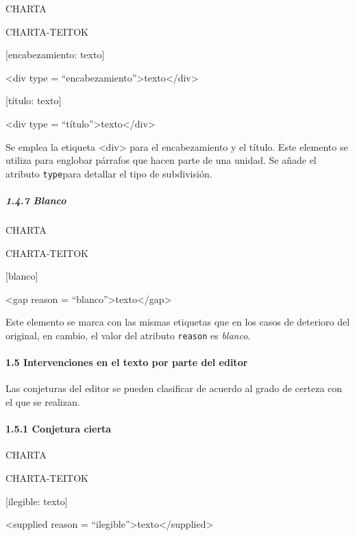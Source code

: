 \documentclass[
]{book}
\begin{document}
CHARTA

CHARTA-TEITOK

{[}encabezamiento: texto{]}

{\textless div} {type} {=} {``encabezamiento''}{\textgreater{}}texto{\textless/div\textgreater{}}

{[}título: texto{]}

{\textless div} {type} {=} {``título''}{\textgreater{}}texto{\textless/div\textgreater{}}

Se emplea la etiqueta { \textless div\textgreater{}} para el encabezamiento y el título. Este elemento se utiliza para englobar párrafos que hacen parte de una unidad. Se añade el atributo \texttt{type}para detallar el tipo de subdivisión.

\hypertarget{blanco}{%
\subparagraph*{1.4.7 Blanco}\label{blanco}}

CHARTA

CHARTA-TEITOK

{[}blanco{]}

{\textless gap} {reason} {=} {``blanco''}{\textgreater{}}texto{\textless/gap\textgreater{}}

Este elemento se marca con las mismas etiquetas que en los casos de deterioro del original, en cambio, el valor del atributo \texttt{reason} es \emph{blanco}.

\hypertarget{intervenciones-en-el-texto-por-parte-del-editor}{%
\paragraph*{1.5 Intervenciones en el texto por parte del editor}\label{intervenciones-en-el-texto-por-parte-del-editor}}

Las conjeturas del editor se pueden clasificar de acuerdo al grado de certeza con el que se realizan.

\hypertarget{conjetura-cierta}{%
\paragraph*{1.5.1 Conjetura cierta}\label{conjetura-cierta}}

CHARTA

CHARTA-TEITOK

{[}ilegible: texto{]}

{\textless supplied} {reason} {=} {``ilegible''}{\textgreater{}}texto{\textless/supplied\textgreater{}}
\end{document}
